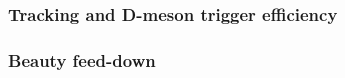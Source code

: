 \newpage
\subsubsection{Tracking and D-meson trigger efficiency}



\subsubsection{Beauty feed-down}

